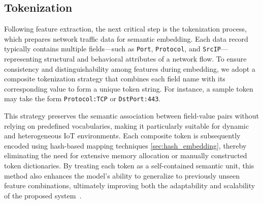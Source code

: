 \begin{ZhChapter}
        

        

    \section{Tokenization}
    Following feature extraction, the next critical step is the tokenization process, which prepares network traffic data for semantic embedding. Each data record typically contains multiple fields—such as \texttt{Port}, \texttt{Protocol}, and \texttt{SrcIP}—representing structural and behavioral attributes of a network flow. To ensure consistency and distinguishability among features during embedding, we adopt a composite tokenization strategy that combines each field name with its corresponding value to form a unique token string. For instance, a sample token may take the form \texttt{Protocol:TCP} or \texttt{DstPort:443}.
    
    This strategy preserves the semantic association between field-value pairs without relying on predefined vocabularies, making it particularly suitable for dynamic and heterogeneous IoT environments. Each composite token is subsequently encoded using hash-based mapping techniques \ref{sec:hash_embedding}, thereby eliminating the need for extensive memory allocation or manually constructed token dictionaries. By treating each token as a self-contained semantic unit, this method also enhances the model’s ability to generalize to previously unseen feature combinations, ultimately improving both the adaptability and scalability of the proposed system~\cite{weinberger2009feature}.



\end{ZhChapter}
